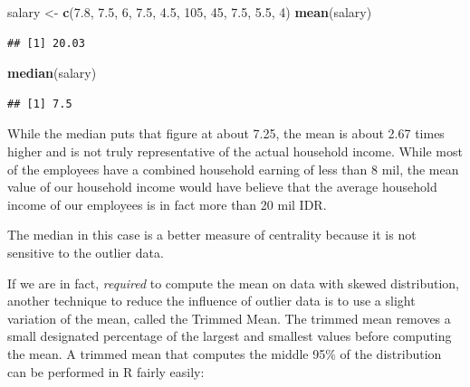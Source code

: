 \documentclass[]{article}
\newenvironment{Shaded}{\begin{snugshade}}{\end{snugshade}}
\newcommand{\CommentTok}[1]{\textcolor[rgb]{0.56,0.35,0.01}{\textit{#1}}}
\newcommand{\DataTypeTok}[1]{\textcolor[rgb]{0.13,0.29,0.53}{#1}}
\newcommand{\DecValTok}[1]{\textcolor[rgb]{0.00,0.00,0.81}{#1}}
\newcommand{\FloatTok}[1]{\textcolor[rgb]{0.00,0.00,0.81}{#1}}
\newcommand{\KeywordTok}[1]{\textcolor[rgb]{0.13,0.29,0.53}{\textbf{#1}}}
\newcommand{\NormalTok}[1]{#1}
\newcommand{\OperatorTok}[1]{\textcolor[rgb]{0.81,0.36,0.00}{\textbf{#1}}}
\newcommand{\StringTok}[1]{\textcolor[rgb]{0.31,0.60,0.02}{#1}}
\begin{document}
\begin{Shaded}
\begin{Highlighting}[]
\NormalTok{salary <-}\StringTok{ }\KeywordTok{c}\NormalTok{(}\FloatTok{7.8}\NormalTok{, }\FloatTok{7.5}\NormalTok{, }\DecValTok{6}\NormalTok{, }\FloatTok{7.5}\NormalTok{, }\FloatTok{4.5}\NormalTok{, }\DecValTok{105}\NormalTok{, }\DecValTok{45}\NormalTok{, }\FloatTok{7.5}\NormalTok{, }\FloatTok{5.5}\NormalTok{, }\DecValTok{4}\NormalTok{)}
\KeywordTok{mean}\NormalTok{(salary)}
\end{Highlighting}
\end{Shaded}

\begin{verbatim}
## [1] 20.03
\end{verbatim}

\begin{Shaded}
\begin{Highlighting}[]
\KeywordTok{median}\NormalTok{(salary)}
\end{Highlighting}
\end{Shaded}

\begin{verbatim}
## [1] 7.5
\end{verbatim}

While the median puts that figure at about 7.25, the mean is about 2.67
times higher and is not truly representative of the actual household
income. While most of the employees have a combined household earning of
less than 8 mil, the mean value of our household income would have
believe that the average household income of our employees is in fact
more than 20 mil IDR.

The median in this case is a better measure of centrality because it is
not sensitive to the outlier data.

If we are in fact, \emph{required} to compute the mean on data with
skewed distribution, another technique to reduce the influence of
outlier data is to use a slight variation of the mean, called the
Trimmed Mean. The trimmed mean removes a small designated percentage of
the largest and smallest values before computing the mean. A trimmed
mean that computes the middle 95\% of the distribution can be performed
in R fairly easily:

\begin{Shaded}
\end{Shaded}
\end{document}
